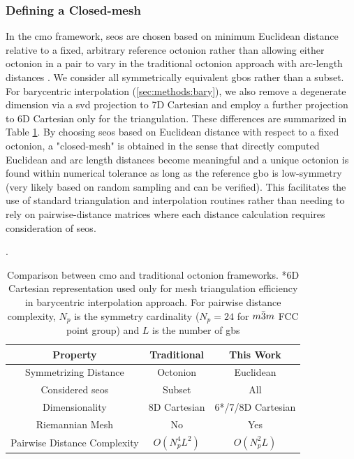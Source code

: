\documentclass[preprint,12pt]{elsarticle}
\begin{document}
\subsubsection{Defining a Closed-mesh}
In the \gls{cmo} framework, \glspl{seo} are chosen based on minimum Euclidean distance relative to a fixed, arbitrary reference octonion rather than allowing either octonion in a pair to vary in the traditional octonion approach with arc-length distances \cite{francisGeodesicOctonionMetric2019}. We consider all symmetrically equivalent \glspl{gbo} rather than a subset. For barycentric interpolation (\ref{sec:methods:bary}), we also remove a degenerate dimension via a \gls{svd} projection to 7D Cartesian and employ a further projection to 6D Cartesian only for the triangulation. These differences are summarized in Table \ref{tab:closed-mesh-comparison}. By choosing \glspl{seo} based on Euclidean distance with respect to a fixed octonion, a "closed-mesh" is obtained in the sense that directly computed Euclidean and arc length distances become meaningful and a unique octonion is found within numerical tolerance as long as the reference \gls{gbo} is low-symmetry (very likely based on random sampling and can be verified). This facilitates the use of standard triangulation and interpolation routines rather than needing to rely on pairwise-distance matrices where each distance calculation requires consideration of \glspl{seo}.

\begin{table}[] \label{tab:closed-mesh-comparison}
\caption{Comparison between \acrlong{cmo} and traditional octonion frameworks. *6D Cartesian representation used only for mesh triangulation efficiency in barycentric interpolation approach. For pairwise distance complexity, $N_p$ is the symmetry cardinality ($N_p=24$ for $m\Bar{3}m$ FCC point group) and $L$ is the number of \glspl{gb}}. \\
\centering
\begin{tabular}{ccc}
\hline
Property                                        & Traditional   & This Work                \\
\hline
Symmetrizing Distance                   & Octonion      & Euclidean                \\
Considered \glspl{seo}                  & Subset         & All                      \\
Dimensionality                          & 8D Cartesian  & 6*/7/8D Cartesian \\
Riemannian Mesh                         & No            & Yes                      \\
Pairwise Distance Complexity            & $O(N_p^4L^2)$ & $O(N_p^2L)$             
\end{tabular}
\end{table}
\end{document}

